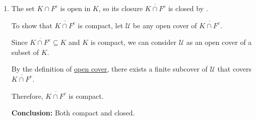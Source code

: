 {\begin{enumerate}
    \item The set \(K \cap F^c\) is open in \(K\), so its closure \(\overline{K \cap F^c}\) is closed by .

    To show that \(\overline{K \cap F^c}\) is compact, let \(\mathcal{U}\) be any open cover of \(\overline{K \cap F^c}\).

    Since \(\overline{K \cap F^c} \subseteq K\) and \(K\) is compact, we can consider \(\mathcal{U}\) as an open cover of a subset of \(K\).

    By the definition of \hyperref[def:3.3.3]{open cover}, there exists a finite subcover of \(\mathcal{U}\) that covers \(\overline{K \cap F^c}\).

    Therefore, \(\overline{K \cap F^c}\) is compact.

    \textbf{Conclusion:} Both compact and closed.

\end{enumerate}
}



